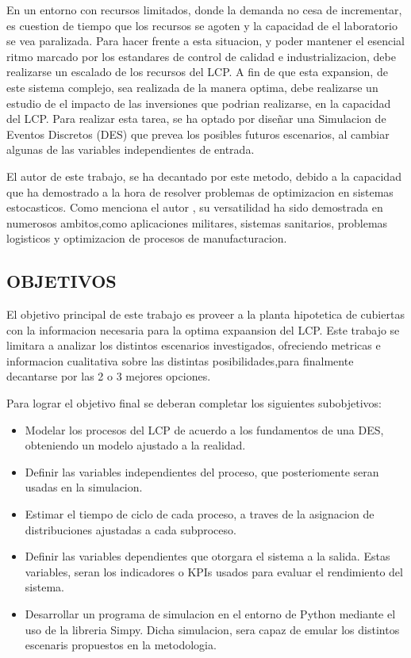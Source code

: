 En un entorno con recursos limitados,
donde la demanda no cesa de incrementar,
es cuestion de tiempo que los recursos se agoten
y la capacidad de el laboratorio se vea paralizada.
Para hacer frente a esta situacion,
y poder mantener el esencial ritmo
marcado por los estandares de control de calidad e industrializacion,
debe realizarse un escalado de los recursos del LCP.
A fin de que esta expansion, de este sistema complejo,
sea realizada de la manera optima,
debe realizarse un estudio de el impacto
de las inversiones que podrian realizarse, en la capacidad del LCP.
Para realizar esta tarea,
se ha optado por diseñar una Simulacion de Eventos Discretos (DES)
que prevea los posibles futuros escenarios,
al cambiar algunas de las variables independientes de entrada.

El autor de este trabajo, se ha decantado por este metodo,
debido a la capacidad que ha demostrado
a la hora de resolver problemas de optimizacion en sistemas estocasticos.
Como menciona el autor \citep{allen2011introduction},
su versatilidad ha sido demostrada en numerosos ambitos,como
aplicaciones militares,
sistemas sanitarios,
problemas logisticos
y optimizacion de procesos de manufacturacion.

\subsection{OBJETIVOS}
El objetivo principal de este trabajo
es proveer a la planta hipotetica de cubiertas
con la informacion necesaria para la optima expaansion del LCP.
Este trabajo se limitara a analizar los distintos escenarios investigados,
ofreciendo metricas e informacion cualitativa sobre las distintas posibilidades,para finalmente decantarse por las 2 o 3 mejores opciones.

Para lograr el objetivo final se deberan completar los siguientes subobjetivos:

\begin{itemize}
	\item Modelar los procesos del LCP
		de acuerdo a los fundamentos de una DES,
		obteniendo un modelo ajustado a la realidad.
	\item Definir las variables independientes del proceso,
		que posteriomente seran usadas en la simulacion.
	\item Estimar el tiempo de ciclo de cada proceso,
		a traves de la asignacion de
		distribuciones ajustadas a cada subproceso.
	\item Definir las variables dependientes
		que otorgara el sistema a la salida.
		Estas variables, seran los indicadores o KPIs
		usados para evaluar el rendimiento del sistema.
	\item Desarrollar un programa de simulacion en el entorno de Python
		mediante el uso de la libreria Simpy.
		Dicha simulacion, sera capaz de emular
		los distintos escenaris propuestos en la metodologia.
\end{itemize}
